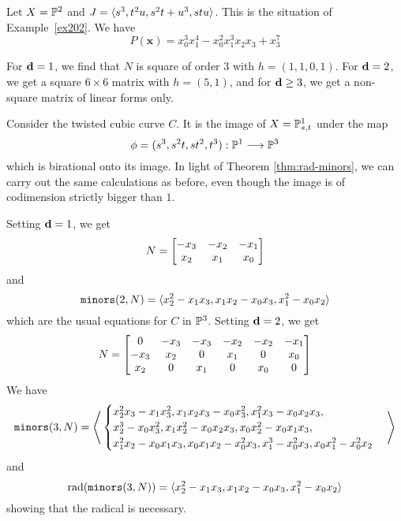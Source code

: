 \documentclass[fleqn,reqno]{amsart}
\begin{document}
\begin{example}[$\mt{ex306}$]
\label{ex306}
Let $X=\mathbb{P}^2$ and $J=\langle s^{3},t^{2} u,s^{2} t+u^{3},s t u\rangle$.
This is the situation of Example~\ref{ex202}.
We have 
\[
	P(\mathbf x)={x}_{0}^{3} {x}_{1}^{4}-{x}_{0}^{2} {x}_{1}^{3} {x}_{2} {x}_{3}+{x}_{3}^{7}
\]

For $\mathbf d=1$, we find that $N$ is square of order $3$ with $h=(1,1,0,1)$.
For $\mathbf d=2$, we get a square $6\times6$ matrix with $h=(5,1)$,
and for $\mathbf d\geq3$, we get a non-square matrix of linear forms only.
\end{example}

\begin{example}[$\mt{ex307}$]
\label{ex307}
Consider the twisted cubic curve $C$.
It is the image of $X=\mathbb{P}^1_{s,t}$ under the map
\[
	\phi=(s^3,s^2t,st^2,t^3):\mathbb{P}^1\longrightarrow\mathbb{P}^3
\]
which is birational onto its image.
In light of Theorem \ref{thm:rad-minors}, we can carry out the same calculations
as before, even though the image is of codimension strictly bigger than $1$.

Setting $\mathbf d=1$, we get
\[
	N=
	\bgroup\begin{bmatrix}{-{x}_{3}}&
      {-{x}_{2}}&
      {-{x}_{1}}\\
      {x}_{2}&
      {x}_{1}&
      {x}_{0}\\
      \end{bmatrix}\egroup
\]
and
\[
	\mathop{\tt minors}(2,N)=\langle {x}_{2}^{2}-{x}_{1} {x}_{3},{x}_{1} {x}_{2}-{x}_{0}
      {x}_{3},{x}_{1}^{2}-{x}_{0} {x}_{2}\rangle
\]
which are the usual equations for $C$ in $\mathbb{P}^3$. Setting $\mathbf d=2$, we get
\[
	N=
	\bgroup\begin{bmatrix}0&
      {-{x}_{3}}&
      {-{x}_{3}}&
      {-{x}_{2}}&
      {-{x}_{2}}&
      {-{x}_{1}}\\
      {-{x}_{3}}&
      {x}_{2}&
      0&
      {x}_{1}&
      0&
      {x}_{0}\\
      {x}_{2}&
      0&
      {x}_{1}&
      0&
      {x}_{0}&
      0\\
      \end{bmatrix}\egroup
\]
We have
\[
	\mathop{\tt minors}(3,N)=\Bigg\langle
	\begin{cases}
	{x}_{2}^{2} {x}_{3}-{x}_{1} {x}_{3}^{2},
	{x}_{1} {x}_{2} {x}_{3}-{x}_{0}{x}_{3}^{2},
	{x}_{1}^{2} {x}_{3}-{x}_{0} {x}_{2} {x}_{3},\\
	{x}_{2}^{3}-{x}_{0}{x}_{3}^{2},
	{x}_{1} {x}_{2}^{2}-{x}_{0} {x}_{2} {x}_{3},
	{x}_{0}{x}_{2}^{2}-{x}_{0} {x}_{1} {x}_{3},\\
	{x}_{1}^{2} {x}_{2}-{x}_{0} {x}_{1}{x}_{3},
	{x}_{0} {x}_{1} {x}_{2}-{x}_{0}^{2} {x}_{3},
	{x}_{1}^{3}-{x}_{0}^{2}{x}_{3},{x}_{0} {x}_{1}^{2}-{x}_{0}^{2} {x}_{2}
	\end{cases}
	\Bigg\rangle
\]
and
\[
	\operatorname{rad}(\mathop{\tt minors}(3,N))=
	\langle {x}_{2}^{2}-{x}_{1} {x}_{3},{x}_{1} {x}_{2}-{x}_{0}
	      {x}_{3},{x}_{1}^{2}-{x}_{0} {x}_{2}\rangle
\]
showing that the radical is necessary.
\end{example}
\end{document}
